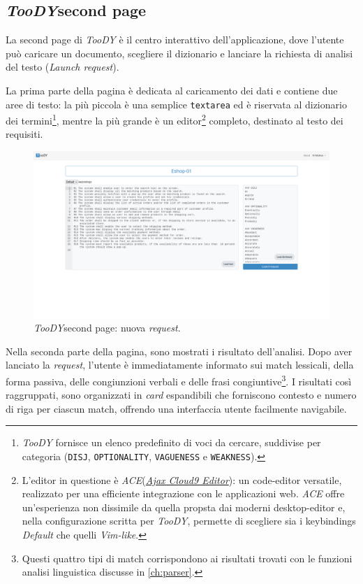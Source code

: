 \documentclass[12pt]{report}
\newcommand{\toody}{\textsl{TooDY}\xspace}
\newcommand{\ace}{\textsl{ACE}\xspace}
\begin{document}
\subsection{\toody \textsf{second page}}
La \textsf{second page} di \toody è il centro interattivo dell'applicazione, dove l'utente può caricare un documento, scegliere il dizionario e lanciare la richiesta di analisi del testo (\textit{Launch request}).

La prima parte della pagina è dedicata al caricamento dei dati e contiene due aree di testo: la più piccola è una semplice \texttt{textarea} ed è riservata al dizionario dei termini\footnote{\toody fornisce un elenco predefinito di voci da cercare, suddivise per categoria (\texttt{DISJ}, \texttt{OPTIONALITY}, \texttt{VAGUENESS} e \texttt{WEAKNESS}).}, mentre la più grande è un editor\footnote{L'editor in questione è \ace (\href{https://ace.c9.io/}{\textit{Ajax Cloud9 Editor}}): un code-editor versatile, realizzato per una efficiente integrazione con le applicazioni web. \ace offre un'esperienza non dissimile da quella propsta dai moderni desktop-editor e, nella configurazione scritta per \toody, permette di scegliere sia i keybindings \textsl{Default} che quelli \textsl{Vim-like}.} completo, destinato al testo dei requisiti.

\begin{figure}[H]
\centering
\includegraphics[width=1.0\textwidth]{pagina2-vuota.png}
\caption{\toody \textsf{second page}: nuova \textit{request}.}
\label{fig:pagina1-login}
\end{figure}

Nella seconda parte della pagina, sono mostrati i risultato dell'analisi. Dopo aver lanciato la \textit{request}, l'utente è immediatamente informato sui match lessicali, della forma passiva, delle congiunzioni verbali e delle frasi congiuntive\footnote{Questi quattro tipi di match corrispondono ai risultati trovati con le funzioni analisi linguistica discusse in \cref{ch:parser}.}. I risultati così raggruppati, sono organizzati in \textit{card} espandibili che forniscono contesto e numero di riga per ciascun match, offrendo una interfaccia utente facilmente navigabile.
\end{document}
